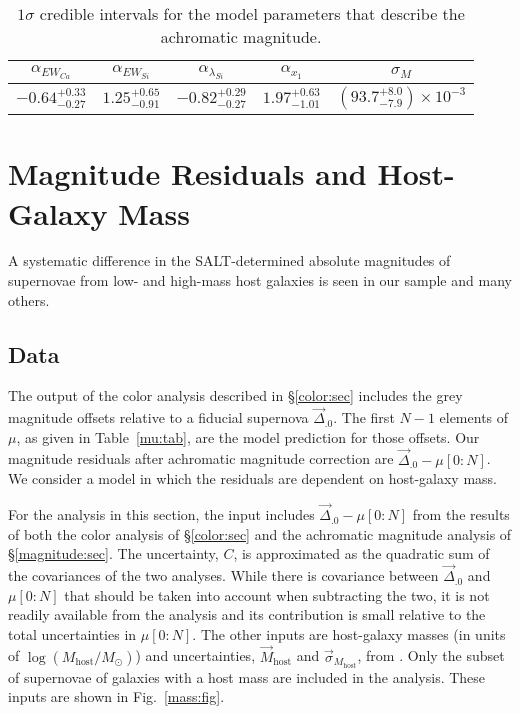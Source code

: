 \documentclass{aastex61}   	%
\begin{document}
\begin{table}
    \centering
    \caption{$1\sigma$ credible intervals for the model parameters that describe the achromatic magnitude.}
    \label{magci:tab}
    \begin{tabular}{ccccc}
        \hline
		 $\alpha_{EW_{Ca}}$ & $\alpha_{EW_{Si}}$ & $\alpha_{\lambda_{Si}}$ & $\alpha_{x_1}$ & $\sigma_M$ \\ 
		\hline
		$-0.64^{+0.33}_{-0.27}$ & $1.25^{+0.65}_{-0.91}$ & $-0.82^{+0.29}_{-0.27}$ & $1.97^{+0.63}_{-1.01}$ & $\left( 93.7^{+8.0}_{-7.9} \right) \times 10^{-3}$ \\ 
		\hline
    \end{tabular}
\end{table}

\section{Magnitude Residuals and Host-Galaxy Mass}

A systematic difference in the SALT-determined absolute magnitudes of supernovae from low- and high-mass host galaxies is seen in
our sample and many others.

\subsection{Data}

The output of the color analysis
described in \S\ref{color:sec} includes the grey magnitude offsets relative to a fiducial supernova $\vec{\Delta}_{.0}$.
The first $N-1$ elements of $\mu$, as given in Table~\ref{mu:tab}, are the model prediction for those offsets.
Our magnitude residuals after achromatic magnitude correction are $\vec{\Delta}_{.0} - \mu[0:N]$.
We consider  a model in which the residuals are dependent
on host-galaxy mass.

For the analysis in this section, the input includes $\vec{\Delta}_{.0} - \mu[0:N]$ from
the results of both the color analysis of \S\ref{color:sec} and the achromatic magnitude analysis of 
\S\ref{magnitude:sec}.  The
uncertainty, $C$, is approximated as the quadratic sum of the covariances of the two analyses.  
While there is covariance between $\vec{\Delta}_{.0}$ and $\mu[0:N]$ that should be taken into account when
subtracting the two,  it is not readily available from the analysis
and its contribution is small relative to the total uncertainties in $\mu[0:N]$.
The other inputs are 
host-galaxy masses (in units of $\log{(M_{\mathrm{host}}/M_{\odot})}$) and uncertainties, $\vec{M}_{\text{host}}$  and
$\vec{\sigma}_{M_{\text{host}}}$,
from \citet{2013ApJ...770..108C}.  Only the subset of supernovae of galaxies with a host mass are included in the analysis.
These inputs are shown in Fig.~\ref{mass:fig}.
\end{document}
